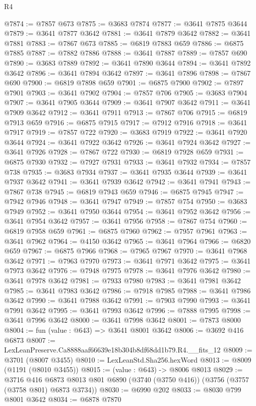 \begin{lexlean}{R4}
\begin{coremodule}
@7874 := @7857 @673
@7875 := @3683 @7874
@7877 := @3641 @7875 @3644
@7879 := @3641 @7877 @3642
@7881 := @3641 @7879 @3642
@7882 := @3641 @7881
@7883 := @7867 @673
@7885 := @6819 @7883 @659
@7886 := @6875 @7885
@7887 := @7882 @7886
@7888 := @3641 @7887
@7889 := @7857 @690
@7890 := @3683 @7889
@7892 := @3641 @7890 @3644
@7894 := @3641 @7892 @3642
@7896 := @3641 @7894 @3642
@7897 := @3641 @7896
@7898 := @7867 @690
@7900 := @6819 @7898 @659
@7901 := @6875 @7900
@7902 := @7897 @7901
@7903 := @3641 @7902
@7904 := @7857 @706
@7905 := @3683 @7904
@7907 := @3641 @7905 @3644
@7909 := @3641 @7907 @3642
@7911 := @3641 @7909 @3642
@7912 := @3641 @7911
@7913 := @7867 @706
@7915 := @6819 @7913 @659
@7916 := @6875 @7915
@7917 := @7912 @7916
@7918 := @3641 @7917
@7919 := @7857 @722
@7920 := @3683 @7919
@7922 := @3641 @7920 @3644
@7924 := @3641 @7922 @3642
@7926 := @3641 @7924 @3642
@7927 := @3641 @7926
@7928 := @7867 @722
@7930 := @6819 @7928 @659
@7931 := @6875 @7930
@7932 := @7927 @7931
@7933 := @3641 @7932
@7934 := @7857 @738
@7935 := @3683 @7934
@7937 := @3641 @7935 @3644
@7939 := @3641 @7937 @3642
@7941 := @3641 @7939 @3642
@7942 := @3641 @7941
@7943 := @7867 @738
@7945 := @6819 @7943 @659
@7946 := @6875 @7945
@7947 := @7942 @7946
@7948 := @3641 @7947
@7949 := @7857 @754
@7950 := @3683 @7949
@7952 := @3641 @7950 @3644
@7954 := @3641 @7952 @3642
@7956 := @3641 @7954 @3642
@7957 := @3641 @7956
@7958 := @7867 @754
@7960 := @6819 @7958 @659
@7961 := @6875 @7960
@7962 := @7957 @7961
@7963 := @3641 @7962
@7964 := @4150 @3642
@7965 := @3641 @7964
@7966 := @6820 @659
@7967 := @6875 @7966
@7968 := @7965 @7967
@7970 := @3641 @7968 @3642
@7971 := @7963 @7970
@7973 := @3641 @7971 @3642
@7975 := @3641 @7973 @3642
@7976 := @7948 @7975
@7978 := @3641 @7976 @3642
@7980 := @3641 @7978 @3642
@7981 := @7933 @7980
@7983 := @3641 @7981 @3642
@7985 := @3641 @7983 @3642
@7986 := @7918 @7985
@7988 := @3641 @7986 @3642
@7990 := @3641 @7988 @3642
@7991 := @7903 @7990
@7993 := @3641 @7991 @3642
@7995 := @3641 @7993 @3642
@7996 := @7888 @7995
@7998 := @3641 @7996 @3642
@8000 := @3641 @7998 @3642
@8001 := @7873 @8000
@8004 := fun (value : @643) => @3641 @8001 @3642
@8006 := @3692 @416 @6873
@8007 := LexLeanPreserve.Ca8888aaf66639e18b304b8df68dd1b79.R4.__fits_12
@8009 := @3701 (@8007 @3455)
@8010 := LexLeanStd.Sha256.hexWord
@8013 := @8009 (@1191 (@8010 @3455))
@8015 := (value : @643) -> @8006 @8013
@8029 := @3716
    @416
    @6873
    @8013
    @801
    @6890
    (@3740 (@3750 @416))
    (@3756 (@3757 (@3758 @801) @6873 @3734))
@8030 := @6990 @202
@8033 := @8030 @799 @8001 @3642
@8034 := @6878 @7870

\end{coremodule}
\end{lexlean}

